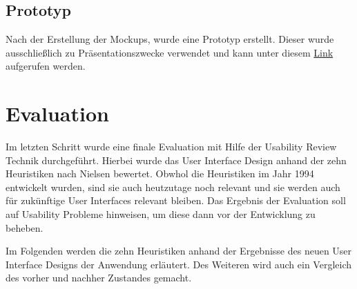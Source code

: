 \clearpage

\subsection{Prototyp}

Nach der Erstellung der Mockups, wurde eine Prototyp erstellt.
Dieser wurde ausschließlich zu Präsentationszwecke verwendet und kann unter diesem \href{https://figma.fun/71cjZX}{Link} aufgerufen werden.

\section{Evaluation}

Im letzten Schritt wurde eine finale Evaluation mit Hilfe der Usability Review Technik durchgeführt.
Hierbei wurde das User Interface Design anhand der zehn Heuristiken nach Nielsen bewertet.
Obwhol die Heuristiken im Jahr 1994 entwickelt wurden, sind sie auch heutzutage noch relevant und sie werden auch für zukünftige User Interfaces relevant bleiben. \citep[vgl.]{jakob_2020}
Das Ergebnis der Evaluation soll auf Usability Probleme hinweisen, um diese dann vor der Entwicklung zu beheben.

Im Folgenden werden die zehn Heuristiken anhand der Ergebnisse des neuen User Interface Designs der Anwendung erläutert.
Des Weiteren wird auch ein Vergleich des vorher und nachher Zustandes gemacht.

